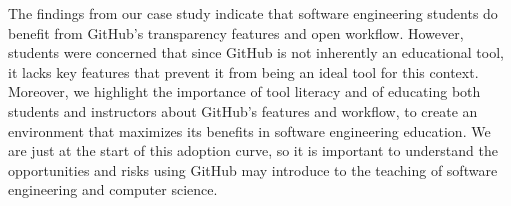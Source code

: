 The findings from our case study indicate that software engineering students do benefit from GitHub's transparency features and open workflow. However, students were concerned  that since GitHub is not inherently an educational tool, it lacks key features that prevent it from being an ideal tool for this context. Moreover, we highlight the importance of tool literacy and of educating both students and instructors about GitHub's features and workflow, to create an environment that maximizes its benefits in software engineering education.  We are just at the start of this adoption curve, so it is important to understand the opportunities and risks using GitHub may introduce to the teaching of software engineering and computer science.  



